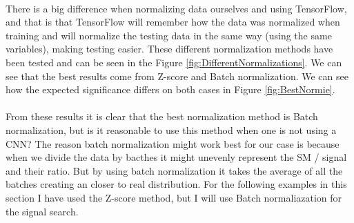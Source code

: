 \documentclass[14pt, a4paper]{book}
\begin{document}
\\There is a big difference when normalizing data ourselves and using TensorFlow, and that is that TensorFlow will remember how the data was normalized when training and will normalize the testing data in the same way (using the same variables), making testing easier.
These different normalization methods have been tested and can be seen in the Figure \ref{fig:DifferentNormalizations}. 
We can see that the best results come from Z-score and Batch normalization. We can see how the expected significance differs on both cases in Figure \ref{fig:BestNormie}.\\
\\From these results it is clear that the best normalization method is Batch normalization, but is it reasonable to use this method when one is not using a CNN? The reason batch normalization might work best for our case is because when we divide the data by bacthes it might unevenly represent the SM / signal and their ratio. But by using batch normalization it takes the average of all the batches creating an closer to real distribution. 
For the following examples in this section I have used the Z-score method, but I will use Batch normaliazation for the signal search.\\ 
\graphicspath{{../../../Plots/TESTING/NeuralNetwork/NORMALIZATIONS/}}
\end{document}
